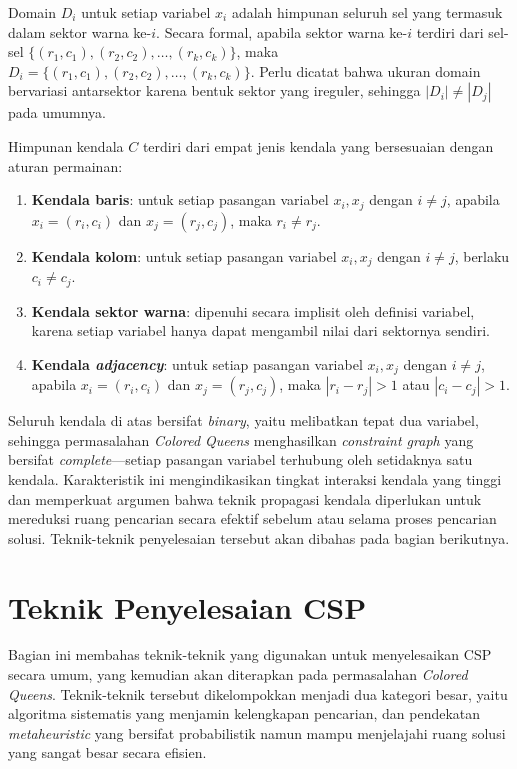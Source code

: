 Domain $D_i$ untuk setiap variabel $x_i$ adalah himpunan seluruh sel yang termasuk dalam sektor warna ke-$i$. Secara formal, apabila sektor warna ke-$i$ terdiri dari sel-sel $\{(r_1, c_1), (r_2, c_2), \dots, (r_k, c_k)\}$, maka $D_i = \{(r_1, c_1), (r_2, c_2), \dots, (r_k, c_k)\}$. Perlu dicatat bahwa ukuran domain bervariasi antarsektor karena bentuk sektor yang ireguler, sehingga $|D_i| \neq |D_j|$ pada umumnya.

Himpunan kendala $C$ terdiri dari empat jenis kendala yang bersesuaian dengan aturan permainan:

\begin{enumerate}
	\item \textbf{Kendala baris}: untuk setiap pasangan variabel $x_i, x_j$ dengan $i \neq j$, apabila $x_i = (r_i, c_i)$ dan $x_j = (r_j, c_j)$, maka $r_i \neq r_j$.
	\item \textbf{Kendala kolom}: untuk setiap pasangan variabel $x_i, x_j$ dengan $i \neq j$, berlaku $c_i \neq c_j$.
	\item \textbf{Kendala sektor warna}: dipenuhi secara implisit oleh definisi variabel, karena setiap variabel hanya dapat mengambil nilai dari sektornya sendiri.
	\item \textbf{Kendala \textit{adjacency}}: untuk setiap pasangan variabel $x_i, x_j$ dengan $i \neq j$, apabila $x_i = (r_i, c_i)$ dan $x_j = (r_j, c_j)$, maka $|r_i - r_j| > 1$ atau $|c_i - c_j| > 1$.
\end{enumerate}

Seluruh kendala di atas bersifat \textit{binary}, yaitu melibatkan tepat dua variabel, sehingga permasalahan \textit{Colored Queens} menghasilkan \textit{constraint graph} yang bersifat \textit{complete}—setiap pasangan variabel terhubung oleh setidaknya satu kendala. Karakteristik ini mengindikasikan tingkat interaksi kendala yang tinggi dan memperkuat argumen bahwa teknik propagasi kendala diperlukan untuk mereduksi ruang pencarian secara efektif sebelum atau selama proses pencarian solusi. Teknik-teknik penyelesaian tersebut akan dibahas pada bagian berikutnya.

\section{Teknik Penyelesaian CSP}
\label{sec:teknik-penyelesaian}

Bagian ini membahas teknik-teknik yang digunakan untuk menyelesaikan CSP secara umum, yang kemudian akan diterapkan pada permasalahan \textit{Colored Queens}. Teknik-teknik tersebut dikelompokkan menjadi dua kategori besar, yaitu algoritma sistematis yang menjamin kelengkapan pencarian, dan pendekatan \textit{metaheuristic} yang bersifat probabilistik namun mampu menjelajahi ruang solusi yang sangat besar secara efisien.

